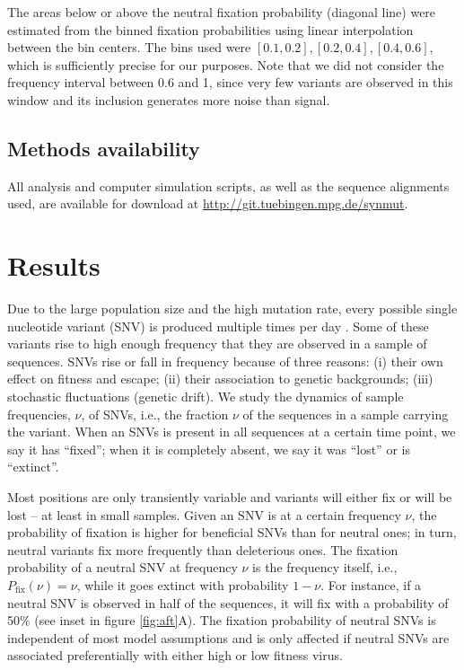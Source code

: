 \documentclass[11pt]{article}
\newcommand{\pfix}{P_{\mathrm{fix}}}
\begin{document}
The areas below or above the neutral fixation probability (diagonal line) were
estimated from the binned fixation probabilities using linear interpolation
between the bin centers. The bins used were $[0.1, 0.2], [0.2, 0.4],
[0.4, 0.6]$, which is sufficiently precise for our purposes. Note that
we did not consider the frequency interval between 0.6 and 1, since very
few variants are observed in this window and its inclusion generates
more noise than signal.
 
\subsection*{Methods availability}
All analysis and computer simulation scripts, as well as the sequence alignments
used, are available for download at \url{http://git.tuebingen.mpg.de/synmut}.


\section*{Results}
Due to the large population size and the high mutation rate, every
possible single nucleotide variant (SNV) is produced multiple times per
day \citep{coffin_hiv_1995}. Some of these variants rise to high enough
frequency that they are observed in a sample of sequences. SNVs rise or fall in 
frequency because of three reasons: (i) their own effect on fitness and escape; (ii)
their association to genetic backgrounds; (iii) stochastic fluctuations
(genetic drift). We study the dynamics of sample frequencies, $\nu$, of SNVs,
i.e., the fraction $\nu$ of the sequences in a sample carrying
the variant. When an SNVs is present in all sequences 
at a certain time point, we say it has ``fixed''; when it is completely absent,
we say it was ``lost'' or is ``extinct''. 

Most positions are only transiently variable and variants will either fix or
will be lost -- at least in small samples. Given an SNV is at a certain
frequency $\nu$, the probability of fixation is higher for beneficial
SNVs than for neutral ones; in turn, neutral variants fix more frequently than
deleterious ones. The fixation probability of a
neutral SNV at frequency $\nu$ is the frequency itself, i.e.,
$\pfix(\nu) = \nu$, while it goes extinct with probability $1-\nu$. For
instance, if a neutral SNV is observed in half of the sequences, it will
fix with a probability of 50\% (see inset in figure
\ref{fig:aft}A). The fixation probability of neutral SNVs is
independent of most model assumptions and is only affected if neutral
SNVs are associated preferentially with either high or low fitness
virus.
\end{document}
